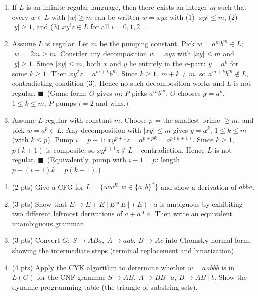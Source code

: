 \documentclass[11pt,a4paper]{article}
\newcounter{prob}
\newenvironment{problem}[1][]{%
  \refstepcounter{prob}%
  \begin{tcolorbox}[enhanced,breakable,colback=white,colframe=SteelBlue!70!black,
      boxrule=0.8pt,arc=1.5mm,left=5pt,right=5pt,top=3pt,bottom=3pt,
      before skip=8pt,after skip=8pt,
      title={\textbf{Question \theprob\ (#1)}},fonttitle=\bfseries, coltitle=white,
      colbacktitle=SteelBlue!70!black, boxed title style={arc=1mm}]}
{\end{tcolorbox}}
\newenvironment{solution}{%
  \begin{tcolorbox}[enhanced,breakable,colback=Honeydew!55,colframe=ForestGreen!60!black,
      boxrule=0.6pt,arc=1.5mm,left=5pt,right=5pt,top=3pt,bottom=3pt,
      before skip=6pt,after skip=10pt,
      title={\textbf{Solution \theprob}},fonttitle=\bfseries, coltitle=white,
      colbacktitle=ForestGreen!60!black, boxed title style={arc=1mm}]}
{\end{tcolorbox}}
\begin{document}
\begin{solution}
\begin{enumerate}[label=(\alph*)]
  \item If $L$ is an infinite regular language, then there exists an
  integer $m$ such that every $w\in L$ with $|w|\ge m$ can be written
  $w=xyz$ with (1) $|xy|\le m$, (2) $|y|\ge1$, and (3)
  $xy^iz\in L$ for all $i=0,1,2,\ldots$
  \item Assume $L$ is regular. Let $m$ be the pumping constant.
  Pick $w=a^mb^m\in L$; $|w|=2m\ge m$. Consider any decomposition
  $w=xyz$ with $|xy|\le m$ and $|y|\ge1$. Since $|xy|\le m$, both
  $x$ and $y$ lie entirely in the $a$-part: $y=a^k$ for some
  $k\ge1$. Then $xy^2z=a^{m+k}b^m$. Since $k\ge1$, $m+k\neq m$, so
  $a^{m+k}b^m\notin L$, contradicting condition (3). Hence no such
  decomposition works and $L$ is not regular. \hfill$\blacksquare$\ 
  (Game form: $O$ gives $m$; $P$ picks $a^mb^m$; $O$ chooses
  $y=a^k$, $1\le k\le m$; $P$ pumps $i=2$ and wins.)
  \item Assume $L$ regular with constant $m$. Choose $p$ = the
  smallest prime $\ge m$, and pick $w=a^p\in L$. Any decomposition
  with $|xy|\le m$ gives $y=a^k$, $1\le k\le m$ (with $k\le p$).
  Pump $i=p+1$: $xy^{p+1}z=a^{p+pk}=a^{p(k+1)}$. Since $k\ge1$,
  $p(k+1)$ is composite, so $xy^{p+1}z\notin L$ -- contradiction.
  Hence $L$ is not regular. \hfill$\blacksquare$\ 
  (Equivalently, pump with $i-1=p$: length $p+(i-1)k=p(k+1)$.)
\end{enumerate}
\end{solution}

\begin{problem}[Context-Free Grammars and Normal Forms -- 12 points]
\begin{enumerate}[label=(\alph*)]
  \item (2 pts) Give a CFG for $L=\{ww^R:w\in\{a,b\}^*\}$ and show a derivation of $abba$.
  \item (3 pts) Show that $E\to E+E\ |\ E*E\ |\ (E)\ |\ a$ is ambiguous by exhibiting two different leftmost derivations of $a+a*a$. Then write an equivalent unambiguous grammar.
  \item (3 pts) Convert $G:\ S\to ABa,\ A\to aab,\ B\to Ac$ into Chomsky normal form, showing the intermediate steps (terminal replacement and binarization).
  \item (4 pts) Apply the CYK algorithm to determine whether $w=aabbb$ is in $L(G)$ for the CNF grammar $S\to AB,\ A\to BB\ |\ a,\ B\to AB\ |\ b$. Show the dynamic programming table (the triangle of substring sets).
\end{enumerate}
\end{problem}
\end{document}
